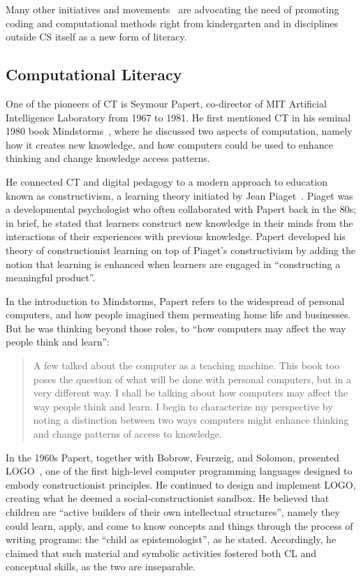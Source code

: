 Many other initiatives and movements~\cite{Lee:2014er,Yadav:2014,Voogt:2015} are advocating the need of promoting coding and computational methods right from kindergarten and in disciplines outside \ac{CS} itself as a new form of literacy.

\subsection{Computational Literacy}
One of the pioneers of \ac{CT} is Seymour Papert, co-director of MIT Artificial Intelligence Laboratory from 1967 to 1981. He first mentioned \ac{CT} in his seminal 1980 book Mindstorms~\cite{Papert:1980uh}, where he discussed two aspects of computation, namely how it creates new knowledge, and how computers could be used to enhance thinking and change knowledge access patterns.

He connected \ac{CT} and digital pedagogy to a modern approach to education known as constructivism, a learning theory initiated by Jean Piaget~\cite{Piaget:1969vq}. Piaget was a developmental psychologist who often collaborated with Papert back in the 80s; in brief, he stated that learners construct new knowledge in their minds from the interactions of their experiences with previous knowledge. Papert developed his theory of constructionist learning on top of Piaget's constructivism by adding the notion that learning is enhanced when learners are engaged in ``constructing a meaningful product''.

In the introduction to Mindstorms, Papert refers to the widespread of personal computers, and how people imagined them permeating home life and businesses. But he was thinking beyond those roles, to ``how computers may affect the way people think and learn'':
\begin{quote}
  A few talked about the computer as a teaching machine. This book too poses the question of what will be done with personal computers, but in a very different way. I shall be talking about how computers may affect the way people think and learn. I begin to characterize my perspective by noting a distinction between two ways computers might enhance thinking and change patterns of access to knowledge.
\end{quote}

In the 1960s Papert, together with Bobrow, Feurzeig, and Solomon, presented LOGO~\cite{chakraborty1999logo}, one of the first high-level computer programming languages designed to embody constructionist principles. He continued to design and implement LOGO, creating what he deemed a social-constructionist sandbox. He believed that children are ``active builders of their own intellectual structures'', namely they could learn, apply, and come to know concepts and things through the process of writing programs: the ``child as epistemologist'', as he stated. Accordingly, he claimed that such material and symbolic activities fostered both \ac{CL} and conceptual skills, as the two are inseparable.

